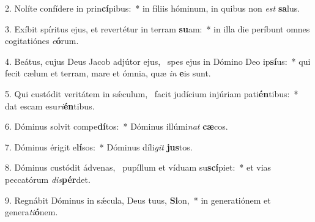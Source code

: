 2. Nolíte confídere in prin\textbf{cí}pibus:~*  in fíliis hóminum, in quibus non \textit{est} \textbf{sa}lus.\

3. Exíbit spíritus ejus, et revertétur in terram \textbf{su}am:~*  in illa die períbunt omnes cogitatiónes \textit{e}\textbf{ó}rum.\

4. Beátus, cujus Deus Jacob adjútor ejus, \dag\  spes ejus in Dómino Deo ip\textbf{sí}us:~*  qui fecit cælum et terram, mare et ómnia, quæ \textit{in} \textbf{e}is sunt.\

5. Qui custódit veritátem in sǽculum, \dag\  facit judícium injúriam pati\textbf{én}tibus:~*  dat escam esu\textit{ri}\textbf{én}tibus.\

6. Dóminus solvit compe\textbf{dí}tos:~*  Dóminus illúmi\textit{nat} \textbf{cæ}cos.\

7. Dóminus érigit e\textbf{lí}sos:~*  Dóminus díli\textit{git} \textbf{jus}tos.\

8. Dóminus custódit ádvenas, \dag\  pupíllum et víduam su\textbf{scí}piet:~*  et vias peccatórum \textit{dis}\textbf{pér}det.\

9. Regnábit Dóminus in sǽcula, Deus tuus, \textbf{Si}on,~*  in generatiónem et genera\textit{ti}\textbf{ó}nem.\

